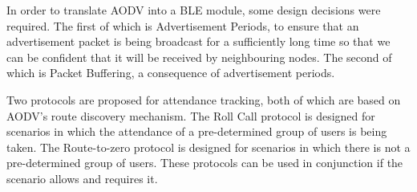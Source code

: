     In order to translate AODV into a BLE module, some design decisions were required.
    The first of which is Advertisement Periods, to ensure that an advertisement
    packet is being broadcast for a sufficiently long time so that we can be
    confident that it will be received by neighbouring nodes. The second of which
    is Packet Buffering, a consequence of advertisement periods.

    Two protocols are proposed for attendance tracking, both of which are based
    on AODV's route discovery mechanism. The Roll Call protocol is designed for scenarios
    in which the attendance of a pre-determined group of users is being taken.
    The Route-to-zero protocol is designed for scenarios in which there is not
    a pre-determined group of users. These protocols can be used in conjunction
    if the scenario allows and requires it.
